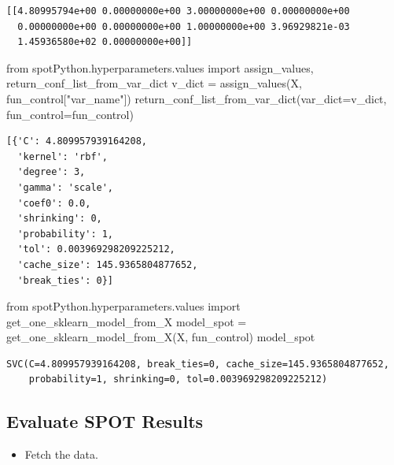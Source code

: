 \documentclass[
  letterpaper,
  DIV=11,
  numbers=noendperiod]{scrreprt}
\newenvironment{Shaded}{\begin{snugshade}}{\end{snugshade}}
\newcommand{\ImportTok}[1]{\textcolor[rgb]{0.00,0.46,0.62}{#1}}
\newcommand{\NormalTok}[1]{\textcolor[rgb]{0.00,0.23,0.31}{#1}}
\newcommand{\OperatorTok}[1]{\textcolor[rgb]{0.37,0.37,0.37}{#1}}
\newcommand{\StringTok}[1]{\textcolor[rgb]{0.13,0.47,0.30}{#1}}
\providecommand{\tightlist}{%
  \setlength{\itemsep}{0pt}\setlength{\parskip}{0pt}}\usepackage{longtable,booktabs,array}
\begin{document}
\begin{verbatim}
[[4.80995794e+00 0.00000000e+00 3.00000000e+00 0.00000000e+00
  0.00000000e+00 0.00000000e+00 1.00000000e+00 3.96929821e-03
  1.45936580e+02 0.00000000e+00]]
\end{verbatim}

\begin{Shaded}
\begin{Highlighting}[]
\ImportTok{from}\NormalTok{ spotPython.hyperparameters.values }\ImportTok{import}\NormalTok{ assign\_values, return\_conf\_list\_from\_var\_dict}
\NormalTok{v\_dict }\OperatorTok{=}\NormalTok{ assign\_values(X, fun\_control[}\StringTok{"var\_name"}\NormalTok{])}
\NormalTok{return\_conf\_list\_from\_var\_dict(var\_dict}\OperatorTok{=}\NormalTok{v\_dict, fun\_control}\OperatorTok{=}\NormalTok{fun\_control)}
\end{Highlighting}
\end{Shaded}

\begin{verbatim}
[{'C': 4.809957939164208,
  'kernel': 'rbf',
  'degree': 3,
  'gamma': 'scale',
  'coef0': 0.0,
  'shrinking': 0,
  'probability': 1,
  'tol': 0.003969298209225212,
  'cache_size': 145.9365804877652,
  'break_ties': 0}]
\end{verbatim}

\begin{Shaded}
\begin{Highlighting}[]
\ImportTok{from}\NormalTok{ spotPython.hyperparameters.values }\ImportTok{import}\NormalTok{ get\_one\_sklearn\_model\_from\_X}
\NormalTok{model\_spot }\OperatorTok{=}\NormalTok{ get\_one\_sklearn\_model\_from\_X(X, fun\_control)}
\NormalTok{model\_spot}
\end{Highlighting}
\end{Shaded}

\begin{verbatim}
SVC(C=4.809957939164208, break_ties=0, cache_size=145.9365804877652,
    probability=1, shrinking=0, tol=0.003969298209225212)
\end{verbatim}

\hypertarget{evaluate-spot-results-2}{%
\subsection{Evaluate SPOT Results}\label{evaluate-spot-results-2}}

\begin{itemize}
\tightlist
\item
  Fetch the data.
\end{itemize}
\end{document}
